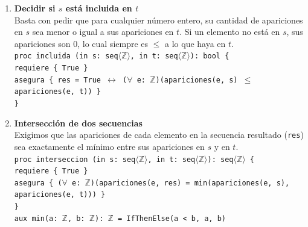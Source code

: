 \begin{enumerate}[label=\textbf{\alph*)}]

    \item \textbf{Decidir si $s$ está incluida en $t$} \\
    Basta con pedir que para cualquier número entero, su cantidad de apariciones en $s$ sea menor o igual a sus apariciones en $t$. Si un elemento no está en $s$, sus apariciones son 0, lo cual siempre es $\leq$ a lo que haya en $t$. \\
    \texttt{proc incluida (in s: seq$\langle\mathbb{Z}\rangle$, in t: seq$\langle\mathbb{Z}\rangle$): bool \{} \\
    \texttt{\hspace*{0.5cm}requiere \{ True \}} \\
    \texttt{\hspace*{0.5cm}asegura \{ res = True $\leftrightarrow$ ($\forall$ e: $\mathbb{Z}$)(apariciones(e, s) $\leq$ apariciones(e, t)) \}} \\
    \texttt{\}}

    \vspace{0.4cm}
    \item \textbf{Intersección de dos secuencias} \\
    Exigimos que las apariciones de cada elemento en la secuencia resultado (\texttt{res}) sea exactamente el mínimo entre sus apariciones en $s$ y en $t$. \\
    \texttt{proc interseccion (in s: seq$\langle\mathbb{Z}\rangle$, in t: seq$\langle\mathbb{Z}\rangle$): seq$\langle\mathbb{Z}\rangle$ \{} \\
    \texttt{\hspace*{0.5cm}requiere \{ True \}} \\
    \texttt{\hspace*{0.5cm}asegura \{ ($\forall$ e: $\mathbb{Z}$)(apariciones(e, res) = min(apariciones(e, s), apariciones(e, t))) \}} \\
    \texttt{\}} \\
    \texttt{aux min(a: $\mathbb{Z}$, b: $\mathbb{Z}$): $\mathbb{Z}$ = IfThenElse(a < b, a, b)}


\end{enumerate}
